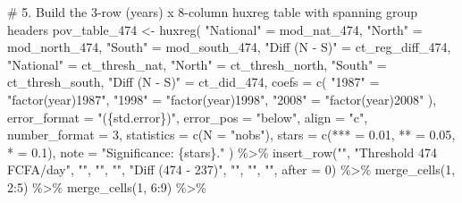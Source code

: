 \documentclass[
  letterpaper,
  DIV=11,
  numbers=noendperiod]{scrartcl}
\newenvironment{Shaded}{\begin{snugshade}}{\end{snugshade}}
\newcommand{\AttributeTok}[1]{\textcolor[rgb]{0.40,0.45,0.13}{#1}}
\newcommand{\CommentTok}[1]{\textcolor[rgb]{0.37,0.37,0.37}{#1}}
\newcommand{\DecValTok}[1]{\textcolor[rgb]{0.68,0.00,0.00}{#1}}
\newcommand{\FloatTok}[1]{\textcolor[rgb]{0.68,0.00,0.00}{#1}}
\newcommand{\FunctionTok}[1]{\textcolor[rgb]{0.28,0.35,0.67}{#1}}
\newcommand{\NormalTok}[1]{\textcolor[rgb]{0.00,0.23,0.31}{#1}}
\newcommand{\OtherTok}[1]{\textcolor[rgb]{0.00,0.23,0.31}{#1}}
\newcommand{\SpecialCharTok}[1]{\textcolor[rgb]{0.37,0.37,0.37}{#1}}
\newcommand{\StringTok}[1]{\textcolor[rgb]{0.13,0.47,0.30}{#1}}
\begin{document}
\begin{Shaded}
\begin{Highlighting}[]
\CommentTok{\# 5. Build the 3{-}row (years) x 8{-}column huxreg table with spanning group headers}
\NormalTok{pov\_table\_474 }\OtherTok{\textless{}{-}} \FunctionTok{huxreg}\NormalTok{(}
  \StringTok{"National"} \OtherTok{=}\NormalTok{ mod\_nat\_474,}
  \StringTok{"North"} \OtherTok{=}\NormalTok{ mod\_north\_474,}
  \StringTok{"South"} \OtherTok{=}\NormalTok{ mod\_south\_474,}
  \StringTok{"Diff (N {-} S)"} \OtherTok{=}\NormalTok{ ct\_reg\_diff\_474,}
  \StringTok{"National"} \OtherTok{=}\NormalTok{ ct\_thresh\_nat,}
  \StringTok{"North"} \OtherTok{=}\NormalTok{ ct\_thresh\_north,}
  \StringTok{"South"} \OtherTok{=}\NormalTok{ ct\_thresh\_south,}
  \StringTok{"Diff (N {-} S)"} \OtherTok{=}\NormalTok{ ct\_did\_474,}
  \AttributeTok{coefs =} \FunctionTok{c}\NormalTok{(}
    \StringTok{"1987"} \OtherTok{=} \StringTok{"factor(year)1987"}\NormalTok{,}
    \StringTok{"1998"} \OtherTok{=} \StringTok{"factor(year)1998"}\NormalTok{,}
    \StringTok{"2008"} \OtherTok{=} \StringTok{"factor(year)2008"}
\NormalTok{  ),}
  \AttributeTok{error\_format =} \StringTok{"(\{std.error\})"}\NormalTok{,}
  \AttributeTok{error\_pos =} \StringTok{"below"}\NormalTok{,}
  \AttributeTok{align =} \StringTok{"c"}\NormalTok{,}
  \AttributeTok{number\_format =} \DecValTok{3}\NormalTok{,}
  \AttributeTok{statistics =} \FunctionTok{c}\NormalTok{(}\AttributeTok{N =} \StringTok{"nobs"}\NormalTok{),}
  \AttributeTok{stars =} \FunctionTok{c}\NormalTok{(}\StringTok{\textasciigrave{}}\AttributeTok{***}\StringTok{\textasciigrave{}} \OtherTok{=} \FloatTok{0.01}\NormalTok{, }\StringTok{\textasciigrave{}}\AttributeTok{**}\StringTok{\textasciigrave{}} \OtherTok{=} \FloatTok{0.05}\NormalTok{, }\StringTok{\textasciigrave{}}\AttributeTok{*}\StringTok{\textasciigrave{}} \OtherTok{=} \FloatTok{0.1}\NormalTok{),}
  \AttributeTok{note =} \StringTok{"Significance: \{stars\}."}
\NormalTok{) }\SpecialCharTok{\%\textgreater{}\%}
  \FunctionTok{insert\_row}\NormalTok{(}\StringTok{""}\NormalTok{, }\StringTok{"Threshold 474 FCFA/day"}\NormalTok{, }\StringTok{""}\NormalTok{, }\StringTok{""}\NormalTok{, }\StringTok{""}\NormalTok{, }\StringTok{"Diff (474 {-} 237)"}\NormalTok{, }\StringTok{""}\NormalTok{, }\StringTok{""}\NormalTok{, }\StringTok{""}\NormalTok{, }\AttributeTok{after =} \DecValTok{0}\NormalTok{) }\SpecialCharTok{\%\textgreater{}\%}
  \FunctionTok{merge\_cells}\NormalTok{(}\DecValTok{1}\NormalTok{, }\DecValTok{2}\SpecialCharTok{:}\DecValTok{5}\NormalTok{) }\SpecialCharTok{\%\textgreater{}\%}
  \FunctionTok{merge\_cells}\NormalTok{(}\DecValTok{1}\NormalTok{, }\DecValTok{6}\SpecialCharTok{:}\DecValTok{9}\NormalTok{) }\SpecialCharTok{\%\textgreater{}\%}

\end{Highlighting}
\end{Shaded}
\end{document}
